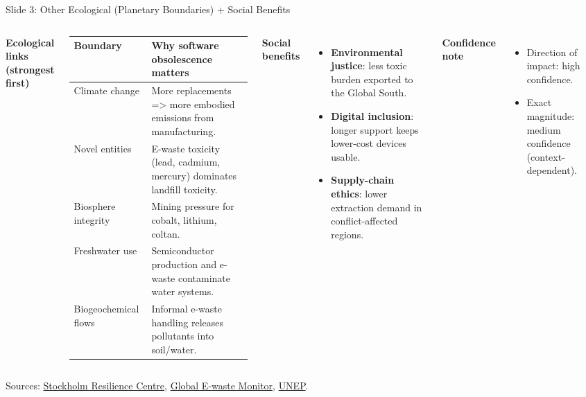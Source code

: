 \documentclass[aspectratio=169]{beamer}
\begin{document}

\begin{frame}{Slide 3: Other Ecological (Planetary Boundaries) + Social Benefits}
\scriptsize
\begin{columns}[T,totalwidth=\textwidth]
\textbf{Ecological links (strongest first)}
\begin{tabular}{p{2.4cm}p{4.8cm}}
\toprule
Boundary & Why software obsolescence matters \\
\midrule
Climate change & More replacements => more embodied emissions from manufacturing. \\
Novel entities & E-waste toxicity (lead, cadmium, mercury) dominates landfill toxicity. \\
Biosphere integrity & Mining pressure for cobalt, lithium, coltan. \\
Freshwater use & Semiconductor production and e-waste contaminate water systems. \\
Biogeochemical flows & Informal e-waste handling releases pollutants into soil/water. \\
\bottomrule
\end{tabular}

\textbf{Social benefits}
\begin{itemize}
  \item \textbf{Environmental justice}: less toxic burden exported to the Global South.
  \item \textbf{Digital inclusion}: longer support keeps lower-cost devices usable.
  \item \textbf{Supply-chain ethics}: lower extraction demand in conflict-affected regions.
\end{itemize}

\textbf{Confidence note}
\begin{itemize}
  \item Direction of impact: high confidence.
  \item Exact magnitude: medium confidence (context-dependent).
\end{itemize}
\end{columns}
\vspace{0.08cm}
\tiny Sources: \href{https://www.stockholmresilience.org/research/planetary-boundaries.html}{Stockholm Resilience Centre}, \href{https://ewastemonitor.info/the-global-e-waste-monitor-2024/}{Global E-waste Monitor}, \href{https://www.unep.org}{UNEP}.
\end{frame}
\end{document}

